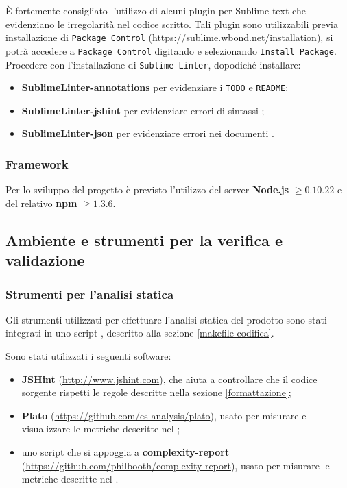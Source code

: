         \`E fortemente consigliato l'utilizzo di alcuni plugin per Sublime text che evidenziano le irregolarità nel codice scritto. Tali plugin sono utilizzabili previa installazione di \texttt{Package Control} (\url{https://sublime.wbond.net/installation}), si potrà accedere a \texttt{Package Control} digitando  e selezionando \texttt{Install Package}. Procedere con l'installazione di \texttt{Sublime Linter}, dopodiché installare:
        \begin{itemize}
            \item \textbf{SublimeLinter-annotations} per evidenziare i \texttt{TODO} e \texttt{README};
            \item \textbf{SublimeLinter-jshint} per evidenziare errori di sintassi ;
            \item \textbf{SublimeLinter-json} per evidenziare errori nei documenti .
        \end{itemize}
		
		\subsubsection{Framework}
		
		Per lo sviluppo del progetto è previsto l'utilizzo del server \textbf{Node.js} $\geq 0.10.22$ e del relativo  \textbf{npm} $\geq 1.3.6$.

	\subsection{Ambiente e strumenti per la verifica e validazione}

	\subsubsection{Strumenti per l'analisi statica}
		Gli strumenti utilizzati per effettuare l'analisi statica del prodotto sono stati
	integrati in uno script , descritto alla sezione \ref{makefile-codifica}.
		
		Sono stati utilizzati i seguenti software:
		\begin{itemize}
		\item \textbf{JSHint} (\url{http://www.jshint.com}),  che aiuta a controllare che il codice sorgente rispetti le regole descritte nella sezione \ref{formattazione};
		\item \textbf{Plato} (\url{https://github.com/es-analysis/plato}),  usato per misurare e visualizzare le metriche descritte nel \PianoDiQualifica{};
		\item uno script che si appoggia a \textbf{complexity-report} (\url{https://github.com/philbooth/complexity-report}),  usato per misurare le metriche descritte nel \PianoDiQualifica{}.
		\end{itemize}
		
